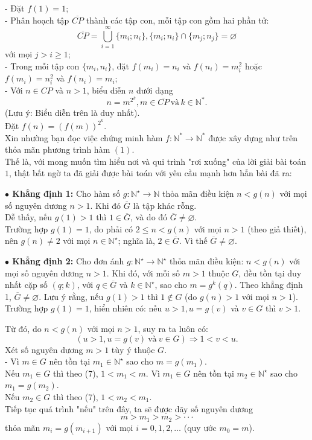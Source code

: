 - Đặt $f(1)=1$;\\
- Phân hoạch tập $\overline{CP}$ thành các tập con, mỗi tập con gồm hai phần tử: $$\overline{CP}=\bigcup\limits_{i=1}^{\infty}\{m_i;n_i\},\{m_i;n_i\}\cap\{m_j;n_j\}=\varnothing$$
với mọi $j>i\geq 1$;\\
- Trong mỗi tập con $\{m_i,n_i\}$, đặt $f\left(m_i\right)=n_i$ và $f\left(n_i\right)=m_i^2$ hoặc $f\left(m_i\right)=n_i^2$ và $f\left(n_i\right)=m_i$;\\
- Với $n\in CP$ và $n>1$, biểu diễn $n$ dưới dạng $$n=m^{2^k}, m\in\overline{CP} \, \text{và}\, k\in\mathbb{N}^*.$$
(Lưu ý: Biểu diễn trên là duy nhất).\\
Đặt $f(n)=\left(f(m)\right)^{2^k}.$\\
Xin nhường bạn đọc việc chứng minh hàm $f: \mathbb{N}^*\longrightarrow \mathbb{N}^*$ được xây dựng như trên thỏa mãn phương trình hàm $(1)$.\\
Thế là, với mong muốn tìm hiểu nơi và qui trình "rơi xuống" của lời giải bài toán $1$, thật bất ngờ ta đã giải được bài toán với yêu cầu mạnh hơn hẳn bài đã ra:

{\bf$\bullet$ Khẳng định 1:} Cho hàm số $g: \mathbb{N}^\star\longrightarrow \mathbb{N}$ thỏa mãn điều kiện $n<g(n)$ với mọi số nguyên dương $n>1$. Khi đó $\overline{G}$ là tập khác rỗng.\\
Dễ thấy, nếu $g(1)>1$ thì $1\in\overline{G}$, và do đó $\overline{G}\ne\varnothing$.\\
Trường hợp $g(1)=1$, do phải có $2\le n<g(n)$ với mọi $n>1$ (theo giả thiết), nên $g(n)\ne 2$ với mọi $n\in \mathbb{N}^\star$; nghĩa là, $2\in \overline{G}$. Vì thế $\overline{G}\ne\varnothing$.

{\bf$\bullet$ Khẳng định 2:} Cho đơn ánh $g: \mathbb{N}^\star\longrightarrow \mathbb{N}^\star$ thỏa mãn điều kiện: $n<g(n)$ với mọi số nguyên dương $n>1$. Khi đó, với mỗi số $m>1$ thuộc $G$, đều tồn tại duy nhất cặp số $(q;k)$, với $q\in \overline{G}$ và $k\in\mathbb{N}^\star$, sao cho $m=g^k(q)$.
\cm Theo khẳng định 1, $\overline{G}\ne\varnothing$. Lưu ý rằng, nếu $g(1)>1$ thì $1\notin G$ (do $g(n)>1$ với mọi $n>1$). Trường hợp $g(1)=1$, hiển nhiên có: nếu $u>1, u=g(v)$ và $v\in G$ thì $v>1$.

Từ đó, do $n<g(n)$ với mọi $n>1$, suy ra ta luôn có:
\[(u>1, u=g(v)\ \text{và}\  v\in G)\Rightarrow 1<v<u.\tag{7}\]   
Xét số nguyên dương $m>1$ tùy ý thuộc $G$.\\
- Vì $m\in G$ nên tồn tại $m_1\in\mathbb{N}^\star$ sao cho $m=g(m_1)$.\\
Nếu $m_1\in G$ thì theo (7), $1<m_1<m$. Vì $m_1\in G$ nên tồn tại $m_2\in \mathbb{N}^\star$ sao cho $m_1=g(m_2)$.\\
Nếu $m_2\in G$ thì theo (7), $1<m_2<m_1$.\\
Tiếp tục quá trình "nếu" trên đây, ta sẽ được dãy số nguyên dương \[m>m_1>m_2>\cdot\cdot\cdot \tag{8}\] 
thỏa mãn $m_i=g(m_{i+1})$ với mọi $i=0, 1, 2,\ldots$ (quy ước $m_0=m$).

